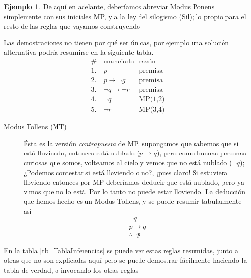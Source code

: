 \documentclass{book}
\theoremstyle{definition}
\newtheorem{ejm}{Ejemplo}[chapter]
\begin{document}
\begin{ejm}
	De aquí en adelante, deberíamos abreviar Modus Ponens simplemente con sus iniciales MP, y a la ley del silogismo (Sil); lo propio para el resto de las reglas que vayamos construyendo
	
	Las demostraciones no tienen por qué ser únicas, por ejemplo una solución alternativa podría resumirse en la siguiente tabla.
	\begin{align*}
		\# \, & \text{enunciado} & \text{razón}\\
		1.& p & \text{premisa} \\
		2.& p \rightarrow \neg g & \text{premisa}\\
		3.& \neg q \rightarrow \neg r & \text{premisa}\\
		4.& \neg q & \text{MP(1,2)}\\
		5.& \neg r & \text{MP(3,4)}
	\end{align*}
\end{ejm}
\begin{description}
	\item[Modus Tollens (MT)] Ésta es la versión \emph{contrapuesta} de MP, supongamos que sabemos que si está lloviendo, entonces está nublado ($p \rightarrow q$), pero como buenas personas curiosas que somos, volteamos al cielo y vemos que no está nublado ($\neg q$); ¿Podemos contestar si está lloviendo o no?, ¡pues claro! Si estuviera lloviendo entonces por MP deberíamos deducir que está nublado, pero ya vimos que no lo está. Por lo tanto no puede estar lloviendo. 
	La deducción que hemos hecho es un Modus Tollens, y se puede resumir tabularmente así
	\begin{equation*}\begin{split}
		\neg q \\ p \rightarrow q \\ \hline \therefore \neg p
	\end{split}	\end{equation*}
\end{description}

En la tabla \ref{tb_TablaInferencias} se puede ver estas reglas resumidas, junto a otras que no son explicadas aquí pero se puede demostrar fácilmente haciendo la tabla de verdad, o invocando los otras reglas. 
\end{document}
